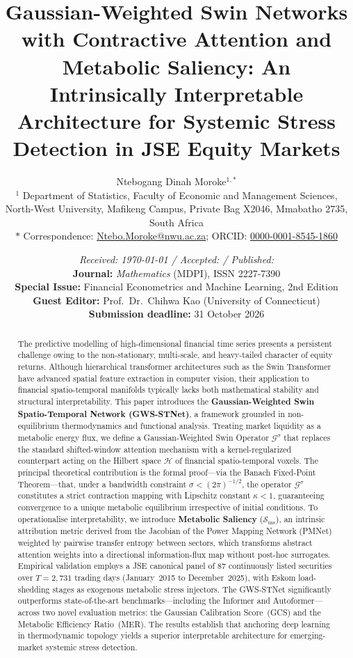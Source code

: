 \documentclass[11pt,a4paper]{article}  %
\title{\textbf{Gaussian-Weighted Swin Networks with Contractive
Attention and Metabolic Saliency: An Intrinsically Interpretable
Architecture for Systemic Stress Detection in JSE Equity Markets}}
\author{%
Ntebogang Dinah Moroke$^{1,\ast}$\\[4pt]
\small $^{1}$ Department of Statistics, Faculty of Economic and
Management Sciences,\\
\small North-West University, Mafikeng Campus,
Private Bag X2046, Mmabatho 2735, South Africa\\[2pt]
\small $\ast$ Correspondence:
\href{mailto:Ntebo.Moroke@nwu.ac.za}{Ntebo.Moroke@nwu.ac.za};
ORCID: \href{https://orcid.org/0000-0001-8545-1860}{0000-0001-8545-1860}
}
\date{%
\small \textit{Received: \today{} / Accepted: / Published:}\\[2pt]
\small \textbf{Journal:} \textit{Mathematics} (MDPI), ISSN 2227-7390\\[1pt]
\small \textbf{Special Issue:} Financial Econometrics and Machine Learning, 2nd Edition\\
\small \textbf{Guest Editor:} Prof.\ Dr.\ Chihwa Kao (University of Connecticut)\\
\small \textbf{Submission deadline:} 31 October 2026
}
\newcommand{\Hilbert}{\mathcal{H}}
\newcommand{\Gop}{\mathcal{G}^{\sigma}}
\newcommand{\Ssal}{\mathcal{S}_{\mathrm{ms}}}
\theoremstyle{plain}
\theoremstyle{definition}
\theoremstyle{remark}
\begin{document}
\maketitle
\thispagestyle{fancy}

\begin{abstract}
\noindent
The predictive modelling of high-dimensional financial time series
presents a persistent challenge owing to the non-stationary,
multi-scale, and heavy-tailed character of equity returns.
Although hierarchical transformer architectures such as the Swin
Transformer have advanced spatial feature extraction in computer
vision, their application to financial spatio-temporal manifolds
typically lacks both mathematical stability and structural
interpretability. This paper introduces the
\textbf{Gaussian-Weighted Swin Spatio-Temporal Network
(GWS-STNet)}, a framework grounded in non-equilibrium
thermodynamics and functional analysis. Treating market liquidity
as a metabolic energy flux, we define a Gaussian-Weighted Swin
Operator $\Gop$ that replaces the standard shifted-window
attention mechanism with a kernel-regularized counterpart acting
on the Hilbert space $\Hilbert$ of financial spatio-temporal
voxels. The principal theoretical contribution is the formal
proof---via the Banach Fixed-Point Theorem---that, under a
bandwidth constraint $\sigma < (2\pi)^{-1/2}$, the operator
$\Gop$ constitutes a strict contraction mapping with Lipschitz
constant $\kappa < 1$, guaranteeing convergence to a unique
metabolic equilibrium irrespective of initial conditions. To
operationalise interpretability, we introduce \textbf{Metabolic
Saliency} ($\Ssal$), an intrinsic attribution metric derived
from the Jacobian of the Power Mapping Network (PMNet) weighted
by pairwise transfer entropy between sectors, which transforms
abstract attention weights into a directional information-flux
map without post-hoc surrogates. Empirical validation employs a
JSE canonical panel of 87 continuously listed securities over
$T = 2{,}731$ trading days (January~2015 to December~2025), with
Eskom load-shedding stages as exogenous metabolic stress
injectors. The GWS-STNet significantly outperforms state-of-the-art
benchmarks---including the Informer and Autoformer---across two
novel evaluation metrics: the Gaussian Calibration Score~(GCS)
and the Metabolic Efficiency Ratio~(MER). The results establish
that anchoring deep learning in thermodynamic topology yields a
superior interpretable architecture for emerging-market systemic
stress detection.

\end{abstract}
\end{document}
